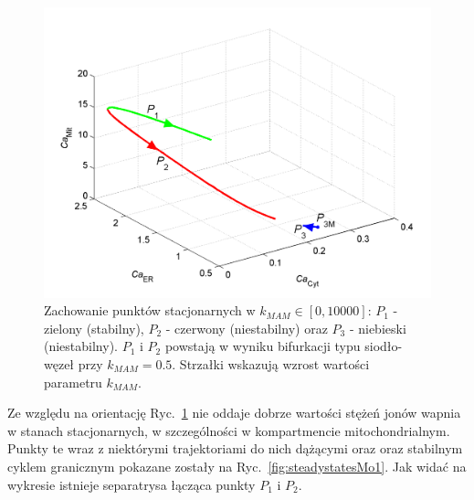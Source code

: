 \begin{figure}[ht]
	\centering
	\includegraphics[width=1\textwidth]{rysunki/rozdzial_5/bifurcation}
	\caption[Zachowanie punktów stacjonarnych w Modelu \#1]{Zachowanie punktów stacjonarnych w  $k_{MAM} \in [0, 10000]$: $P_1$ - zielony (stabilny), $P_2$ - czerwony (niestabilny) oraz $P_3$ - niebieski (niestabilny). $P_1$ i $P_2$ powstają w wyniku bifurkacji typu siodło-węzeł przy $k_{MAM}=0.5$. Strzałki wskazują wzrost wartości parametru $k_{MAM}$.}
	\label{fig:bifurcationMo1}
\end{figure}

Ze względu na orientację Ryc.~\ref{fig:bifurcationMo1} nie oddaje dobrze wartości stężeń jonów wapnia w stanach stacjonarnych, w szczególności w kompartmencie mitochondrialnym.
Punkty te wraz z niektórymi trajektoriami do nich dążącymi oraz oraz stabilnym cyklem granicznym  pokazane zostały na Ryc.~\ref{fig:steadystatesMo1}. Jak widać na wykresie istnieje separatrysa łącząca punkty $P_1$ i $P_2$. 

